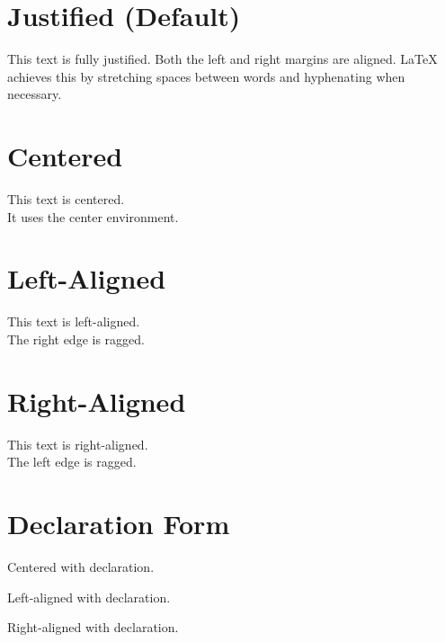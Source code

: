 \documentclass[12pt, a4paper]{article}
\begin{document}
\section*{Justified (Default)}
This text is fully justified. Both the left and right margins are aligned.
LaTeX achieves this by stretching spaces between words and hyphenating
when necessary.

\section*{Centered}
\begin{center}
This text is centered. \\
It uses the center environment.
\end{center}

\section*{Left-Aligned}
\begin{flushleft}
This text is left-aligned. \\
The right edge is ragged.
\end{flushleft}

\section*{Right-Aligned}
\begin{flushright}
This text is right-aligned. \\
The left edge is ragged.
\end{flushright}

\section*{Declaration Form}
{\centering Centered with declaration.\par}
{\raggedright Left-aligned with declaration.\par}
{\raggedleft Right-aligned with declaration.\par}
\end{document}
